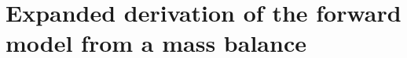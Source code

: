 \documentclass[a4paper,fleqn]{cas-sc}
\begin{document}
\clearpage

\section{Expanded derivation of the forward model from a mass balance}




\clearpage



 
\end{document}
